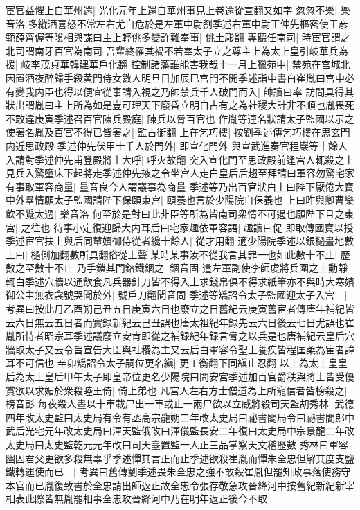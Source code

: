 宦官益懼上自華州還|{
	光化元年上還自華州事見上卷還從宣翻又如字}
忽忽不樂|{
	樂音洛}
多縱酒喜怒不常左右尤自危於是左軍中尉劉季述右軍中尉王仲先樞密使王彦範薛齊偓等隂相與謀曰主上輕佻多變詐難奉事|{
	佻土彫翻}
專聽任南司|{
	時宦官謂之北司謂南牙百官為南司}
吾輩終罹其禍不若奉太子立之尊主上為太上皇引岐華兵為援|{
	岐李茂貞華韓建華戶化翻}
控制諸藩誰能害我哉十一月上獵苑中|{
	禁苑在宫城北}
因置酒夜醉歸手殺黄門侍女數人明旦日加辰巳宫門不開季述詣中書白崔胤曰宫中必有變我内臣也得以便宜從事請入視之乃帥禁兵千人破門而入|{
	帥讀曰率}
訪問具得其狀出謂胤曰主上所為如是豈可理天下廢昏立明自古有之為社稷大計非不順也胤畏死不敢違庚寅季述召百官陳兵殿庭|{
	陳兵以脅百官也}
作胤等連名狀請太子監國以示之使署名胤及百官不得已皆署之|{
	監古衘翻}
上在乞巧樓|{
	按劉季述傳乞巧樓在思玄門内近思政殿}
季述仲先伏甲士千人於門外|{
	即宣化門外}
與宣武進奏官程巖等十餘人入請對季述仲先甫登殿將士大呼|{
	呼火故翻}
突入宣化門至思政殿前逢宫人輒殺之上見兵入驚墮床下起將走季述仲先掖之令坐宫人走白皇后后趨至拜請曰軍容勿驚宅家有事取軍容商量|{
	量音良今人謂議事為商量}
季述等乃出百官狀白上曰陛下厭倦大寶中外羣情願太子監國請陛下保頤東宫|{
	頤養也言於少陽院自保養也}
上曰昨與卿曹樂飲不覺太過|{
	樂音洛}
何至於是對曰此非臣等所為皆南司衆情不可遏也願陛下且之東宫|{
	之往也}
待事小定復迎歸大内耳后曰宅家趣依軍容語|{
	趣讀曰促}
即取傳國寶以授季述宦官扶上與后同輦嬪御侍從者纔十餘人|{
	從才用翻}
適少陽院季述以銀檛畫地數上曰|{
	檛側加翻數所具翻俗從上聲}
某時某事汝不從我言其罪一也如此數十不止|{
	歷數之至數十不止}
乃手鎖其門鎔鐵錮之|{
	錮音固}
遣左軍副使李師䖍將兵圍之上動靜輒白季述穴牆以通飲食凡兵器針刀皆不得入上求錢帛俱不得求紙筆亦不與時大寒嬪御公主無衣衾號哭聞於外|{
	號戶刀翻聞音問}
季述等矯詔令太子監國迎太子入宫　|{
	考異曰按此月乙酉朔己丑五日庚寅六日也廢立之日舊紀云庚寅舊宦者傳唐年補紀皆云六日無云五日者而實録新紀云己丑誤也唐太祖紀年録先云六日後云七日尤誤也崔胤所恃者昭宗耳季述議廢立安肯即從之補録紀年録言脅之以兵是也唐補紀云皇后穴牆取太子又云令旨宣告大臣與社稷為主又云后白軍容令聖上養疾皆程匡柔為宦者諱耳不可信也}
辛卯矯詔令太子嗣位更名縝|{
	更工衡翻下同縝止忍翻}
以上為太上皇皇后為太上皇后甲午太子即皇帝位更名少陽院曰問安宫季述加百官爵秩與將士皆受優賞欲以求媚於衆殺睦王倚|{
	倚上弟也}
凡宫人左右方士僧道為上所寵信者皆榜殺之|{
	榜音彭}
每夜殺人晝以十車載尸出一車或止一兩尸欲以立威將殺司天監胡秀林|{
	武德四年改太史監曰太史局有令有丞高宗龍朔二年改太史局曰祕書閣局令曰祕書閻郎中武后光宅元年改太史局曰渾天監俄改曰渾儀監長安二年復曰太史局中宗景龍二年改太史局曰太史監乾元元年改曰司天臺置監一人正三品掌察天文稽歷數}
秀林曰軍容幽囚君父更欲多殺無辜乎季述憚其言正而止季述欲殺崔胤而憚朱全忠但解其度支鹽鐵轉運使而已　|{
	考異曰舊傳劉季述畏朱全忠之強不敢殺崔胤但罷知政事落使務守本官而已胤復致書於全忠請出師返正故全忠令張存敬急攻晉絳河中按舊紀新紀新宰相表此際皆無胤罷相事全忠攻晉絳河中乃在明年返正後今不取}
